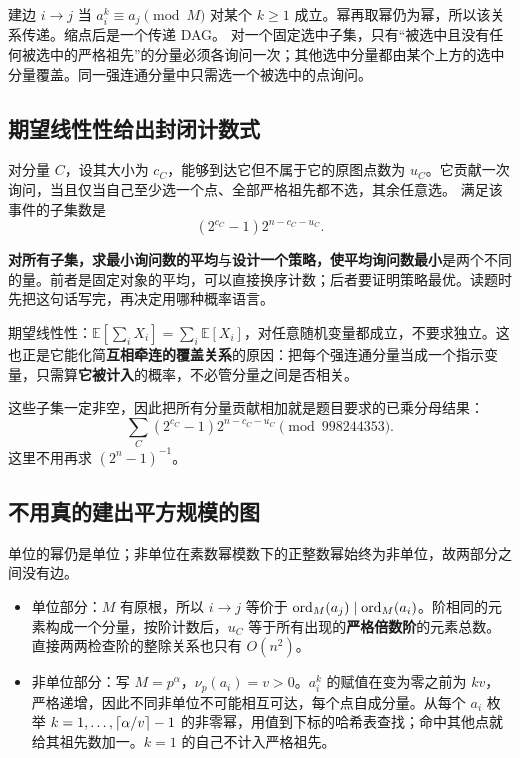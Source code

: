 建边 $i\to j$ 当 $a_i^k\equiv a_j\pmod M$ 对某个 $k\ge1$ 成立。幂再取幂仍为幂，所以该关系传递。缩点后是一个传递 DAG。
对一个固定选中子集，只有“被选中且没有任何被选中的严格祖先”的分量必须各询问一次；其他选中分量都由某个上方的选中分量覆盖。同一强连通分量中只需选一个被选中的点询问。

\subsection{期望线性性给出封闭计数式}
对分量 $C$，设其大小为 $c_C$，能够到达它但不属于它的原图点数为 $u_C$。它贡献一次询问，当且仅当自己至少选一个点、全部严格祖先都不选，其余任意选。
满足该事件的子集数是
\[
 (2^{c_C}-1)2^{n-c_C-u_C}.
\]

\begin{tip}
\textbf{对所有子集，求最小询问数的平均}与\textbf{设计一个策略，使平均询问数最小}是两个不同的量。前者是固定对象的平均，可以直接换序计数；后者要证明策略最优。读题时先把这句话写完，再决定用哪种概率语言。
\end{tip}

\begin{tip}
期望线性性：$\mathbb E[\sum_iX_i]=\sum_i\mathbb E[X_i]$，对任意随机变量都成立，不要求独立。这也正是它能化简\textbf{互相牵连的覆盖关系}的原因：把每个强连通分量当成一个指示变量，只需算\textbf{它被计入}的概率，不必管分量之间是否相关。
\end{tip}

这些子集一定非空，因此把所有分量贡献相加就是题目要求的已乘分母结果：
\[
 \boxed{\sum_C(2^{c_C}-1)2^{n-c_C-u_C}\pmod{998244353}}.
\]
这里不用再求 $(2^n-1)^{-1}$。

\subsection{不用真的建出平方规模的图}
单位的幂仍是单位；非单位在素数幂模数下的正整数幂始终为非单位，故两部分之间没有边。
\begin{itemize}
\item 单位部分：$M$ 有原根，所以 $i\to j$ 等价于 $\operatorname{ord}_M(a_j)\mid\operatorname{ord}_M(a_i)$。阶相同的元素构成一个分量，按阶计数后，$u_C$ 等于所有出现的\textbf{严格倍数阶}的元素总数。直接两两检查阶的整除关系也只有 $O(n^2)$。
\item 非单位部分：写 $M=p^\alpha$，$\nu_p(a_i)=v>0$。$a_i^k$ 的赋值在变为零之前为 $kv$，严格递增，因此不同非单位不可能相互可达，每个点自成分量。从每个 $a_i$ 枚举 $k=1,\ldots,\left\lceil \alpha/v\right\rceil-1$ 的非零幂，用值到下标的哈希表查找；命中其他点就给其祖先数加一。$k=1$ 的自己不计入严格祖先。
\end{itemize}


